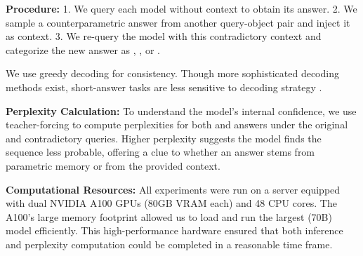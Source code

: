 \textbf{Procedure:}
1. We query each model without context to obtain its \Parametric{} answer.
2. We sample a counterparametric answer from another query-object pair and inject it as context.
3. We re-query the model with this contradictory context and categorize the new answer as \Parametric{}, \Contextual{}, or \Other{}.

We use greedy decoding for consistency. Though more sophisticated decoding methods exist, short-answer tasks are less sensitive to decoding strategy \citep{t5}.

\textbf{Perplexity Calculation:}
To understand the model’s internal confidence, we use teacher-forcing to compute perplexities for both \Parametric{} and \Contextual{} answers under the original and contradictory queries. Higher perplexity suggests the model finds the sequence less probable, offering a clue to whether an answer stems from parametric memory or from the provided context.

\textbf{Computational Resources:}
All experiments were run on a server equipped with dual NVIDIA A100 GPUs (80GB VRAM each) and 48 CPU cores. The A100’s large memory footprint allowed us to load and run the largest (70B) model efficiently. This high-performance hardware ensured that both inference and perplexity computation could be completed in a reasonable time frame.

